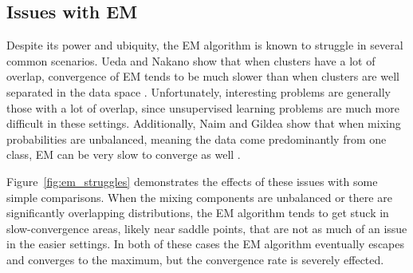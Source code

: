 \documentclass{article}
\theoremstyle{definition}
\theoremstyle{algodesc}
\begin{document}
\subsection{Issues with EM} \label{subsc:em_issues}

Despite its power and ubiquity, the EM algorithm is known to struggle in several common scenarios. Ueda and Nakano show that when clusters have a lot of overlap, convergence of EM tends to be much slower than when clusters are well separated in the data space \cite{uedanakano98}. Unfortunately, interesting problems are generally those with a lot of overlap, since unsupervised learning problems are much more difficult in these settings. Additionally, Naim and Gildea show that when mixing probabilities are unbalanced, meaning the data come predominantly from one class, EM can be very slow to converge as well \cite{naimgildea12}.

Figure~\ref{fig:em_struggles} demonstrates the effects of these issues with some simple comparisons. When the mixing components are unbalanced or there are significantly overlapping distributions, the EM algorithm tends to get stuck in slow-convergence areas, likely near saddle points, that are not as much of an issue in the easier settings. In both of these cases the EM algorithm eventually escapes and converges to the maximum, but the convergence rate is severely effected.
\end{document}
